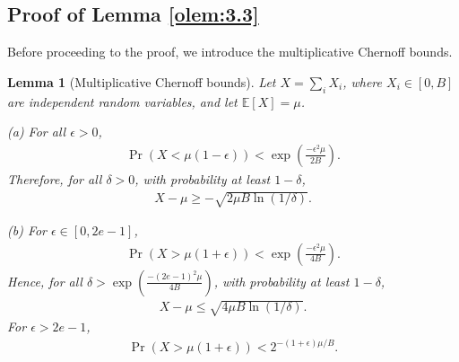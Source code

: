 \documentclass[letterpaper, 10 pt, conference]{ieeeconf}  %
\theoremstyle{plain}
\newtheorem{lemma}{Lemma}
\theoremstyle{definition}
\theoremstyle{remark}
\begin{document}
\subsection{Proof of Lemma \ref{olem:3.3}}
Before proceeding to the proof, we introduce the multiplicative Chernoff bounds.
\begin{lemma}[Multiplicative Chernoff bounds]
Let $X=\sum_i X_i$, where $X_i \in [0,B]$ are independent random variables, and let $\mathbb{E}[X]=\mu$.

(a) For all $\epsilon>0$,
\begin{subequations}
\begin{alignat}{2}
\Pr(X<\mu(1-\epsilon)) < \exp\left(\frac{-\epsilon^2 \mu}{2B}\right). \nonumber
\end{alignat}
\end{subequations}
Therefore, for all $\delta>0$, with probability at least $1-\delta$,
\begin{subequations}
\begin{alignat}{2}
X-\mu \geq -\sqrt{2\mu B \ln(1/\delta)}. \nonumber
\end{alignat}
\end{subequations}

(b) For $\epsilon \in [0,2e-1]$,
\begin{subequations}
\begin{alignat}{2}
\Pr(X>\mu(1+\epsilon)) < \exp \left(\frac{-\epsilon^2 \mu}{4B}\right). \nonumber
\end{alignat}
\end{subequations}
Hence, for all $\delta > \exp \left(\frac{-(2e-1)^2 \mu}{4B}\right)$, with probability at least $1-\delta$,
\begin{subequations}
\begin{alignat}{2}
X-\mu \leq \sqrt{4\mu B \ln(1/\delta)}. \nonumber
\end{alignat}
\end{subequations}
For $\epsilon>2e-1$,
\begin{subequations}
\begin{alignat}{2}
\Pr(X>\mu(1+\epsilon)) < 2^{-(1+\epsilon) \mu/B}. \nonumber
\end{alignat}
\end{subequations}
\end{lemma}
\end{document}
